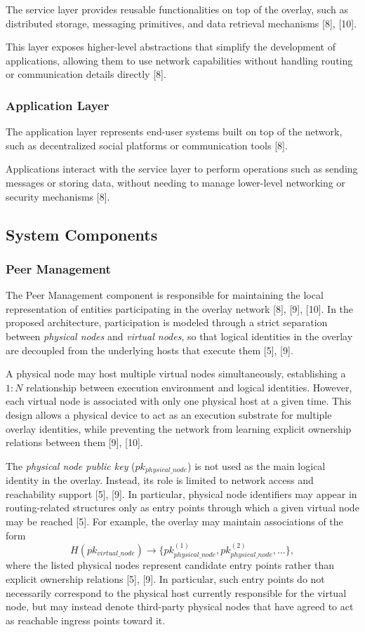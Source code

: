 \documentclass[12pt,a4paper]{article}
\begin{document}
The service layer provides reusable functionalities on top of the overlay, such as distributed storage, messaging primitives, and data retrieval mechanisms [8], [10].

This layer exposes higher-level abstractions that simplify the development of applications, allowing them to use network capabilities without handling routing or communication details directly [8].

\subsubsection{Application Layer}

The application layer represents end-user systems built on top of the network, such as decentralized social platforms or communication tools [8].

Applications interact with the service layer to perform operations such as sending messages or storing data, without needing to manage lower-level networking or security mechanisms [8].


\subsection{System Components}
\subsubsection{Peer Management}

The Peer Management component is responsible for maintaining the local representation of entities participating in the overlay network [8], [9], [10]. In the proposed architecture, participation is modeled through a strict separation between \textit{physical nodes} and \textit{virtual nodes}, so that logical identities in the overlay are decoupled from the underlying hosts that execute them [5], [9].

A physical node may host multiple virtual nodes simultaneously, establishing a $1:N$ relationship between execution environment and logical identities. However, each virtual node is associated with only one physical host at a given time. This design allows a physical device to act as an execution substrate for multiple overlay identities, while preventing the network from learning explicit ownership relations between them [9], [10].

The \textit{physical node public key} ($pk_{physical\_node}$) is not used as the main logical identity in the overlay. Instead, its role is limited to network access and reachability support [5], [9]. In particular, physical node identifiers may appear in routing-related structures only as entry points through which a given virtual node may be reached [5]. For example, the overlay may maintain associations of the form
\[
H(pk_{virtual\_node}) \rightarrow \{pk_{physical\_node}^{(1)}, pk_{physical\_node}^{(2)}, \dots\},
\]
where the listed physical nodes represent candidate entry points rather than explicit
ownership relations [5], [9]. In particular, such entry points do not necessarily correspond
to the physical host currently responsible for the virtual node, but may instead denote
third-party physical nodes that have agreed to act as reachable ingress points toward it.
\end{document}
